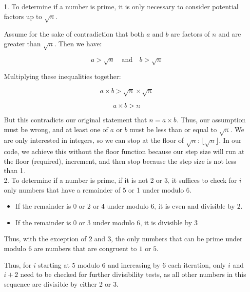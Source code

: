 \documentclass{article}
\begin{document}
1. To determine if a number is prime, it is only necessary to consider potential factors up to \(\sqrt{n}\).

Assume for the sake of contradiction that both \(a\) and \(b\) are factors of \(n\) and are greater than \(\sqrt{n}\). Then we have:

\[ a > \sqrt{n} \quad \text{and} \quad b > \sqrt{n} \]

Multiplying these inequalities together:

\[ a \times b > \sqrt{n} \times \sqrt{n} \]

\[ a \times b > n \]

But this contradicts our original statement that \(n = a \times b\). Thus, our assumption must be wrong, and at least one of \(a\) or \(b\) must be less than or equal to \(\sqrt{n}\).
We are only interested in integers, so we can stop at the floor of  \(\sqrt{n}\): $\lfloor \sqrt{n} \rfloor$. In our code, we achieve this without the floor function because our step size will run at the floor (required), increment, and then stop because the step size is not less than 1.
\\
2. To determine if a number is prime, if it is not 2 or 3, it suffices to check for \( i \) only numbers that have a remainder of 5 or 1 under modulo 6. 
\begin{itemize}
  \item If the remainder is $0$ or $2$ or $4$ under modulo $6$, it is even and divisible by $2$.
  \item If the remainder is $0$ or $3$ under modulo $6$, it is divisible by $3$
\end{itemize}
Thus, with the exception of $2$ and $3$, the only numbers that can be prime under modulo $6$ are numbers that are congruent to $1$ or $5$.

Thus, for \( i \) starting at 5 modulo 6 and increasing by 6 each iteration, only \( i \) and \( i+2 \) need to be checked for further divisibility tests, as all other numbers in this sequence are divisible by either 2 or 3.
\end{document}
